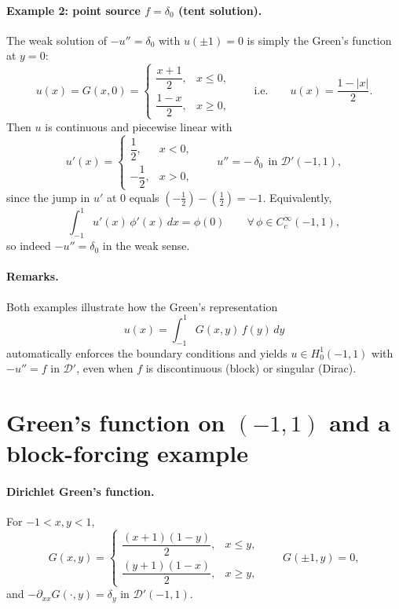 \documentclass[12pt,a4paper]{article}
\theoremstyle{plain}
\theoremstyle{definition}
\theoremstyle{remark}
\theoremstyle{remark}
\begin{document}
\bigskip

\paragraph{Example 2: point source $f=\delta_0$ (tent solution).}
The weak solution of $-u''=\delta_0$ with $u(\pm1)=0$ is simply the Green's function at $y=0$:
\[
u(x)=G(x,0)=
\begin{cases}
	\dfrac{x+1}{2}, & x\le 0,\\[6pt]
	\dfrac{1-x}{2}, & x\ge 0,
\end{cases}
\qquad\text{i.e.}\qquad
u(x)=\dfrac{1-|x|}{2}.
\]
Then $u$ is continuous and piecewise linear with
\[
u'(x)=\begin{cases}\dfrac12,& x<0,\\[2pt]-\dfrac12,& x>0,\end{cases}
\qquad
u'' = -\,\delta_0 \ \ \text{in }\mathcal D'(-1,1),
\]
since the jump in $u'$ at $0$ equals $(-\tfrac12)-(\tfrac12)=-1$.
Equivalently,
\[
\int_{-1}^1 u'(x)\,\phi'(x)\,dx=\phi(0)\qquad \forall\,\phi\in C_c^\infty(-1,1),
\]
so indeed $-u''=\delta_0$ in the weak sense.

\bigskip

\paragraph{Remarks.}
Both examples illustrate how the Green's representation
\[
u(x)=\int_{-1}^1 G(x,y)\,f(y)\,dy
\]
automatically enforces the boundary conditions and yields $u\in H_0^1(-1,1)$ with $-u''=f$ in $\mathcal D'$,
even when $f$ is discontinuous (block) or singular (Dirac).

\clearpage

\section*{Green's function on $(-1,1)$ and a block-forcing example}

\paragraph{Dirichlet Green's function.}
For $-1<x,y<1$,
\[
G(x,y)=
\begin{cases}
	\dfrac{(x+1)(1-y)}{2}, & x\le y,\\[6pt]
	\dfrac{(y+1)(1-x)}{2}, & x\ge y,
\end{cases}
\qquad G(\pm1,y)=0,
\]
and $-\partial_{xx}G(\cdot,y)=\delta_y$ in $\mathcal D'(-1,1)$.
\end{document}
